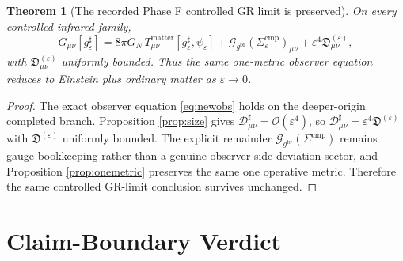 \documentclass[11pt]{article}
\newcommand{\ObserverMetric}{g^{\mathrm{br}}}
\newcommand{\CompletedMetric}{g^{\sharp}}
\newcommand{\CompShift}{\Sigma^{\mathrm{cmp}}}
\newcommand{\GaugeBook}{\mathcal G_{\ObserverMetric}}
\newcommand{\CompDec}{\mathcal D_{\mu\nu}^{\sharp}}
\newcommand{\epsIR}{\varepsilon}
\newtheorem{theorem}{Theorem}
\begin{document}
\begin{theorem}[The recorded Phase F controlled GR limit is preserved]
\label{thm:phaseF}
On every controlled infrared family,
\begin{equation}
G_{\mu\nu}[\CompletedMetric_{\epsIR}]
=
8\pi G_N\,T_{\mu\nu}^{\mathrm{matter}}[\CompletedMetric_{\epsIR},\psi_{\epsIR}]
+\GaugeBook(\CompShift_{\epsIR})_{\mu\nu}
+\epsIR^4\mathfrak D_{\mu\nu}^{(\epsIR)},
\label{eq:phaseFnew}
\end{equation}
with \(\mathfrak D_{\mu\nu}^{(\epsIR)}\) uniformly bounded. Thus the same one-metric observer equation reduces to Einstein plus ordinary matter as \(\epsIR\to0\).
\end{theorem}

\begin{proof}
The exact observer equation \eqref{eq:newobs} holds on the deeper-origin completed branch. Proposition \ref{prop:size} gives \(\CompDec=\mathcal O(\epsIR^4)\), so \(\CompDec=\epsIR^4\mathfrak D^{(\epsIR)}\) with \(\mathfrak D^{(\epsIR)}\) uniformly bounded. The explicit remainder \(\GaugeBook(\CompShift)\) remains gauge bookkeeping rather than a genuine observer-side deviation sector, and Proposition \ref{prop:onemetric} preserves the same one operative metric. Therefore the same controlled GR-limit conclusion survives unchanged.
\end{proof}

\section{Claim-Boundary Verdict}
\end{document}
